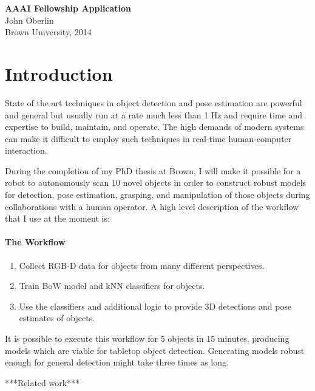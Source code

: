 \documentclass[12pt]{article}
\numberwithin{equation}{section}
\numberwithin{table}{section}
\numberwithin{figure}{section}
\begin{document}



\begin{center}
\textbf{\Large AAAI Fellowship Application}\\[12pt] 
John Oberlin\\
Brown University, 2014\\
\end{center}

\section{Introduction}

State of the art techniques in object detection and pose estimation
are powerful and general but usually run at a rate much less than 1 Hz and require
time and expertise to build, maintain, and operate. The high demands of modern systems
can make it difficult to employ such techniques in real-time human-computer interaction.

During the completion of my PhD thesis at Brown, I will make it possible for a robot
to autonomously scan 10 novel objects in order to construct robust models for detection,
pose estimation, grasping, and manipulation of those objects during collaborations with
a human operator. A high level description of the workflow that I use at the moment is:

\paragraph{The Workflow}
\begin{enumerate}
  \item Collect RGB-D data for objects from many different perspectives.
  \item Train BoW model and kNN classifiers for objects.
  \item Use the classifiers and additional logic to provide 3D detections and pose estimates of objects.
\end{enumerate}

It is possible to execute this workflow for 5 objects in 15 minutes, producing models which are
viable for tabletop object detection. Generating models robust enough for general detection might
take three times as long.

***Related work***
\end{document}
